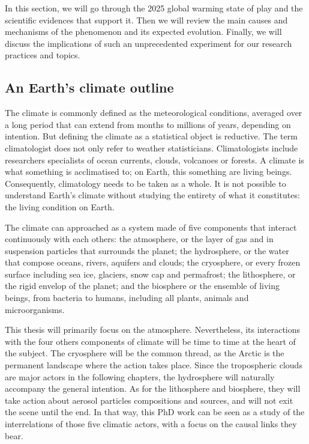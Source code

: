In this section, we will go through the 2025 global warming state of play and the scientific evidences that support it. Then we will review the main causes and mechanisms of the phenomenon and its expected evolution. Finally, we will discuss the implications of such an unprecedented experiment for our research practices and topics.  

\subsection{An Earth's climate outline}
 The climate is commonly defined as the meteorological conditions, averaged over a long period that can extend from months to millions of years, depending on intention.
 But defining the climate as a statistical object is reductive. The term climatologist does not only refer to weather statisticians. Climatologists include researchers specialists of ocean currents, clouds, volcanoes or forests. A climate is what something is acclimatised to; on Earth, this something are living beings. 
Consequently, climatology needs to be taken as a whole.
It is not possible to understand Earth's climate without studying the entirety of what it constitutes: the living condition on Earth.

The climate can approached as a system made of five components that interact continuously with each others: the atmosphere, or the layer of gas and in suspension particles that surrounds the planet; the hydrosphere, or the water that compose oceans, rivers, aquifers and clouds; the cryosphere, or every frozen surface including sea ice, glaciers, snow cap and permafrost; the lithosphere, or the rigid envelop of the planet; and the biosphere or the ensemble of living beings, from bacteria to humans, including all plants, animals and microorganisms.

This thesis will primarily focus on the atmosphere. Nevertheless, its interactions with the four others components of climate will be time to time at the heart of the subject.
The cryosphere will be the common thread, as the Arctic is the permanent landscape where the action takes place.
Since the tropospheric clouds are major actors in the following chapters, the hydrosphere will naturally accompany the general intention.
As for the lithosphere and biosphere, they will take action about aerosol particles compositions and sources, and will not exit the scene until the end.
In that way, this PhD work can be seen as a study of the interrelations of those five climatic actors, with a focus on the causal links they bear.

